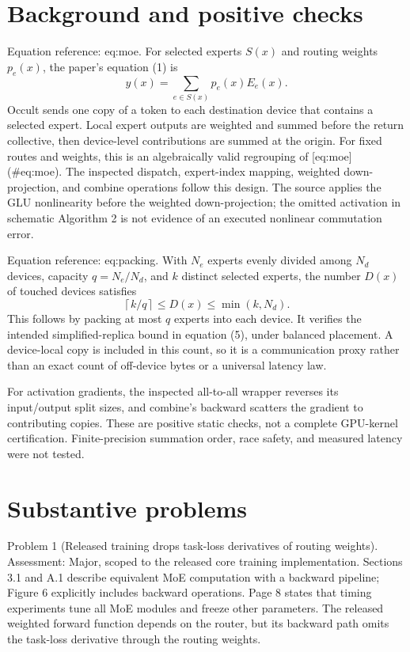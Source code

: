 \documentclass[10pt]{article}
\begin{document}
\section*{Background and positive checks}
Equation reference: eq:moe. For selected experts \(S(x)\) and routing weights \(p_e(x)\), the paper’s equation (1) is \[y(x)=\sum_{e\in S(x)}p_e(x)E_e(x).
 \] Occult sends one copy of a token to each destination device that contains a selected expert. Local expert outputs are weighted and summed before the return collective, then device-level contributions are summed at the origin. For fixed routes and weights, this is an algebraically valid regrouping of [eq:moe] (\#eq:moe). The inspected dispatch, expert-index mapping, weighted down-projection, and combine operations follow this design. The source applies the GLU nonlinearity before the weighted down-projection; the omitted activation in schematic Algorithm 2 is not evidence of an executed nonlinear commutation error.\par
Equation reference: eq:packing. With \(N_e\) experts evenly divided among \(N_d\) devices, capacity \(q=N_e/N_d\), and \(k\) distinct selected experts, the number \(D(x)\) of touched devices satisfies \[\left\lceil k/q\right\rceil\le D(x)\le\min(k,N_d).
 \] This follows by packing at most \(q\) experts into each device. It verifies the intended simplified-replica bound in equation (5), under balanced placement. A device-local copy is included in this count, so it is a communication proxy rather than an exact count of off-device bytes or a universal latency law.\par
For activation gradients, the inspected all-to-all wrapper reverses its input/output split sizes, and combine’s backward scatters the gradient to contributing copies. These are positive static checks, not a complete GPU-kernel certification. Finite-precision summation order, race safety, and measured latency were not tested.\par
\section*{Substantive problems}
Problem 1 (Released training drops task-loss derivatives of routing weights).  Assessment: Major, scoped to the released core training implementation. Sections 3.1 and A.1 describe equivalent MoE computation with a backward pipeline; Figure 6 explicitly includes backward operations. Page 8 states that timing experiments tune all MoE modules and freeze other parameters. The released weighted forward function depends on the router, but its backward path omits the task-loss derivative through the routing weights.\par
\end{document}
